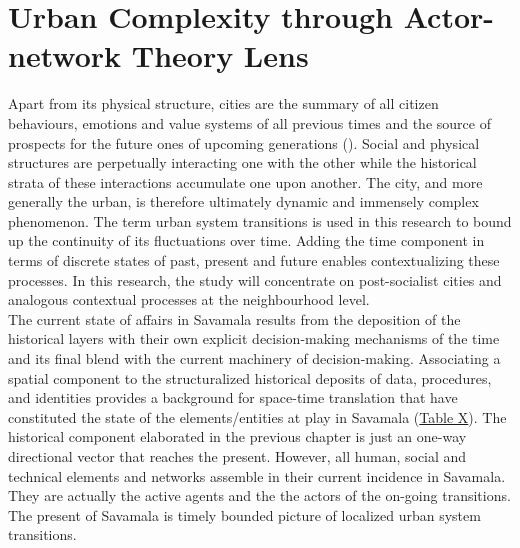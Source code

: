 \documentclass[11pt]{report}
\begin{document}


\chapter{Urban Complexity through Actor-network Theory Lens}

Apart from its physical structure, cities are the summary of all citizen behaviours, emotions and value systems of all previous times and the source of prospects for the future ones of upcoming generations (\cite{Stojkov grad kultura politika}).
Social and physical structures are perpetually interacting one with the other while the historical strata of these interactions accumulate one upon another.
The city, and more generally the urban, is therefore ultimately dynamic and immensely complex phenomenon.
The term urban system transitions %
is used in this research to bound up the continuity of its fluctuations over time.
Adding the time component in terms of discrete states of past, present and future enables contextualizing these processes.
In this research, the study will concentrate on post-socialist cities and analogous contextual processes at the neighbourhood level.
\\

The current state of affairs in Savamala results from the deposition of the historical layers with their own explicit decision-making mechanisms of the time and its final blend with the current machinery of decision-making.
Associating a spatial component to the structuralized historical deposits of data, procedures, and identities provides a background for space-time translation that have constituted the state of the elements/entities at play in Savamala (\href{}{Table X}). 
The historical component elaborated in the previous chapter is just an one-way directional vector that reaches the present.
However, all human, social and technical elements and networks assemble in their current incidence in Savamala. They are actually the active agents and the the actors of the on-going transitions. The present of Savamala is timely bounded picture of localized urban system transitions. 
\\
\end{document}
